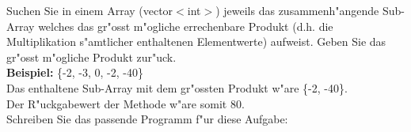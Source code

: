 \documentclass[a4paper,10pt]{article}
\begin{document}
Suchen Sie in einem Array (vector$<$int$>$) jeweils das zusammenh"angende Sub-Array welches das gr"osst m"ogliche errechenbare Produkt (d.h. die Multiplikation s"amtlicher enthaltenen Elementwerte) aufweist. Geben Sie das gr"osst m"ogliche Produkt zur"uck.\\

\textbf{Beispiel:} \{-2, -3, 0, -2, -40\} \\

Das enthaltene Sub-Array mit dem gr"ossten Produkt w"are \{-2, -40\}. \\ Der R"uckgabewert der Methode w"are somit 80. \\

Schreiben Sie das passende Programm f"ur diese Aufgabe:

{ \small

}
\end{document}

